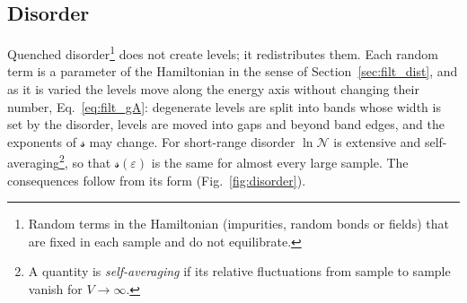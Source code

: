 \documentclass[10pt,a4paper]{article}
\theoremstyle{plain}
\newcommand{\cN}{\mathcal{N}}   %
\newcommand{\lds}{\mathscr{s}}  %
\begin{document}
\subsection{Disorder}
\label{sec:disorder}

Quenched disorder\footnote{Random terms in the Hamiltonian (impurities,
random bonds or fields) that are fixed in each sample and do not
equilibrate.} does not create levels; it redistributes them. Each random
term is a parameter of the Hamiltonian in the sense of
Section~\ref{sec:filt_dist}, and as it is varied the levels move along the
energy axis without changing their number, Eq.~\eqref{eq:filt_gA}:
degenerate levels are split into bands whose width is set by the disorder,
levels are moved into gaps and beyond band edges, and the exponents of
$\lds$ may change. For short-range disorder $\ln\cN$ is extensive and
self-averaging\footnote{A quantity is \emph{self-averaging} if its relative
fluctuations from sample to sample vanish for $V\to\infty$.}, so that
$\lds(\varepsilon)$ is the same for almost every large sample. The
consequences follow from its form (Fig.~\ref{fig:disorder}).
\end{document}
